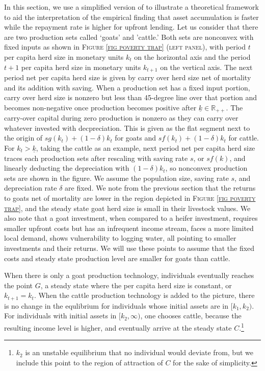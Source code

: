 \vspace{2ex}
	In this section, we use a simplified version of \citet{GalorZeira1993} to illustrate a theoretical framework to aid the interpretation of the empirical finding that asset accumulation is faster while the repayment rate is higher for upfront lending. Let us consider that there are two production sets called `goats' and 'cattle.' Both sets are nonconvex with fixed inputs as shown in \textsc{\small Figure \ref{fig poverty trap} (left panel)}, with period $t$ per capita herd size in monetary units $k_{t}$ on the horizontal axis and the period $t+1$ per capita herd size in monetary units $k_{t+1}$ on the vertical axis. The next period net per capita herd size is given by carry over herd size net of mortality and its addition with saving. When a production set has a fixed input portion, carry over herd size is nonzero but less than 45-degree line over that portion and becomes non-negative once production becomes positive after $\underline{k}\in\mathbb R_{++}$. The carry-over capital during zero production is nonzero as they can carry over whatever invested with decpreciation. 
	This is given as the flat segment next to the origin of $sg(k_{t})+(1-\delta)k_{t}$ for goats and $sf(k_{t})+(1-\delta)k_{t}$ for cattle. For $k_{t}>\underline{k}$, taking the cattle as an example, next period net per capita herd size traces each production sets after rescaling with saving rate $s$, or $sf(k)$, and linearly deducting the depreciation with $(1-\delta)k_{t}$, so nonconvex production sets are shown in the figure. We assume the population size, saving rate $s$, and depreciation rate $\delta$ are fixed. We note from the previous section that the returns to goats net of mortality are lower in the region depicted in \textsc{\small Figure \ref{fig poverty trap}}, and the steady state goat herd size is small in their livestock values. We also note that a goat investment, when compared to a heifer investment, requires smaller upfront costs but has an infrequent income stream, faces a more limited local demand, shows vulnerability to logging water, all pointing to smaller investments and their returns. We will use these points to assume that the fixed costs and steady state production level are smaller for goats than cattle.

	When there is only a goat production technology, individuals eventually reaches the point $G$, a steady state where the per capita herd size is constant, or $k_{t+1}=k_{t}$. When the cattle production technology is added to the picture, there is no change in the equlibrium for individuals whose initial assets are in $[k_{1}, k_{2})$. For individuals with initial assets in $[k_{2}, \infty)$, one chooses cattle, because the resulting income level is higher, and eventually arrive at the steady state $C$.\footnote{$k_{2}$ is an unstable equilibrium that no individual would deviate from, but we include this point to the region of attraction of $C$ for the sake of simplicity. } 

